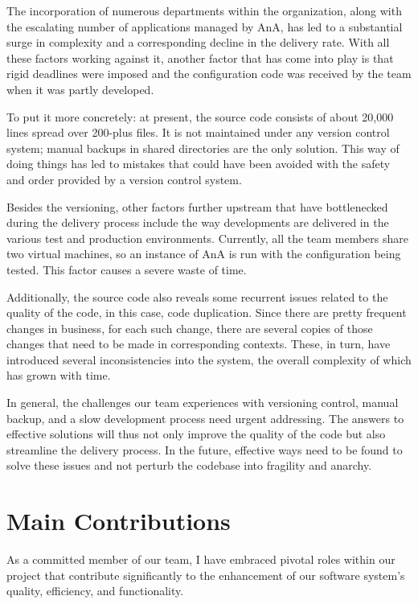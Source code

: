 The incorporation of numerous departments within the organization, along with the escalating number of applications managed by AnA, has led to a substantial surge in complexity and a corresponding decline in the delivery rate. With all these factors working against it, another factor that has come into play is that rigid deadlines were imposed and the configuration code was received by the team when it was partly developed.

To put it more concretely: at present, the source code consists of about 20,000 lines spread over 200-plus files. It is not maintained under any version control system; manual backups in shared directories are the only solution. This way of doing things has led to mistakes that could have been avoided with the safety and order provided by a version control system.

Besides the versioning, other factors further upstream that have bottlenecked during the delivery process include the way developments are delivered in the various test and production environments. Currently, all the team members share two virtual machines, so an instance of AnA is run with the configuration being tested. This factor causes a severe waste of time.

Additionally, the source code also reveals some recurrent issues related to the quality of the code, in this case, code duplication. Since there are pretty frequent changes in business, for each such change, there are several copies of those changes that need to be made in corresponding contexts. These, in turn, have introduced several inconsistencies into the system, the overall complexity of which has grown with time.

In general, the challenges our team experiences with versioning control, manual backup, and a slow development process need urgent addressing. The answers to effective solutions will thus not only improve the quality of the code but also streamline the delivery process. In the future, effective ways need to be found to solve these issues and not perturb the codebase into fragility and anarchy.

\section{Main Contributions}

As a committed member of our team, I have embraced pivotal roles within our project that contribute significantly to the enhancement of our software system’s quality, efficiency, and functionality.

